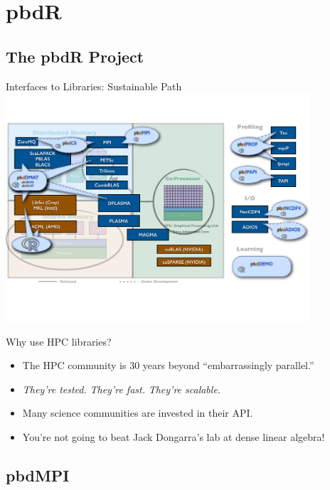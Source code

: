 \section{pbdR}
\makesubcontentsslides

\subsection{The pbdR Project}
\makesubcontentsslidessec

\begin{frame}{\pbdR Interfaces to Libraries: Sustainable Path}
  \vspace{-1ex}
  \centering\includegraphics[trim=0cm 5cm 0cm 3cm,clip=true,width=0.85\textwidth]
  {../common/pics/hardware/ParallelHardware27.pdf}
  \scriptsize
  \begin{block}{Why use HPC libraries?}
    \begin{itemize}[<+-|alert@+>]
    \item The HPC community is 30 years beyond ``embarrassingly parallel.''
    \item \emph{They're tested.} \emph{They're
        fast.}  \emph{They're scalable.}
    \item Many science communities are invested in their API.
    \item You're not going to beat Jack Dongarra's lab at dense linear
      algebra!
    \end{itemize}
  \end{block}
\end{frame}

\subsection{pbdMPI}
\makesubcontentsslidessec

